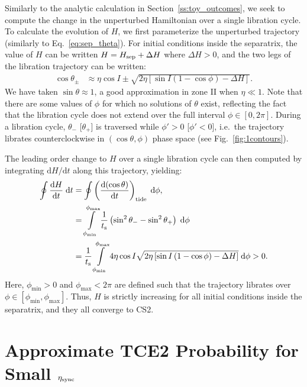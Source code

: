 \documentclass[
        fleqn,
        usenatbib,
    ]{mnras}
\newcommand*{\rd}[2]{\frac{\mathrm{d}#1}{\mathrm{d}#2}}
\newcommand*{\rdil}[2]{\mathrm{d}#1/\mathrm{d}#2}
\newcommand*{\p}[1]{\left(#1\right)}
\newcommand*{\s}[1]{\left[#1\right]}
\begin{document}
Similarly to the analytic calculation in Section~\ref{ss:toy_outcomes}, we seek
to compute the change in the unperturbed Hamiltonian over a single libration
cycle. To calculate the evolution of $H$, we first parameterize the unperturbed
trajectory (similarly to Eq.~\ref{eq:sep_theta}). For initial conditions inside
the separatrix, the value of $H$ can be written $H = H_{\rm sep} + \Delta H$
where $\Delta H > 0$, and the two legs of the libration trajectory can be
written:
\begin{align}
    \cos \theta_{\pm} &\approx
        \eta \cos I \pm \sqrt{2\eta\s{\sin I\p{1 - \cos \phi} - \Delta H}}.
        \label{eq:lib_cycle_toy}
\end{align}
We have taken $\sin \theta \approx 1$, a good approximation in zone II when
$\eta \ll 1$. Note that there are some values of $\phi$ for which no solutions
of $\theta$ exist, reflecting the fact that the libration cycle does not extend
over the full interval $\phi \in [0, 2\pi]$. During a libration cycle,
$\theta_-$ [$\theta_+$] is traversed while $\phi' > 0$ [$\phi' < 0$], i.e.\ the
trajectory librates counterclockwise in $(\cos \theta, \phi)$ phase space (see
Fig.~\ref{fig:1contours}).

The leading order change to $H$ over a single libration cycle can then computed by
integrating $\rdil{H}{t}$ along this trajectory, yielding:
\begin{align}
    \oint \rd{H}{t}\;\mathrm{d}t
        &= \oint \p{\rd{(\cos \theta)}{t}}_{\rm tide}
            \;\mathrm{d}\phi,\nonumber\\
        &= \int\limits_{\phi_{\min}}^{\phi_{\max}}
                \frac{1}{t_{\rm s}}
                \p{\sin^2\theta_- - \sin^2\theta_+} \;\mathrm{d}\phi\nonumber\\
        &= \frac{1}{t_{\rm s}}
            \int\limits_{\phi_{\min}}^{\phi_{\max}}
                4\eta \cos I \sqrt{2\eta\s{\sin I\p{1 - \cos \phi} - \Delta H}}
                \;\mathrm{d}\phi > 0.
\end{align}
Here, $\phi_{\min} > 0$ and $\phi_{\max} < 2\pi$ are defined such that the
trajectory librates over $\phi \in \s{\phi_{\min}, \phi_{\max}}$. Thus, $H$ is
strictly increasing for all initial conditions inside the separatrix, and they
all converge to CS2.

\section{Approximate TCE2 Probability for Small $\eta_{\rm sync}$
}\label{app:sep_crossing_dynamics}
\end{document}
